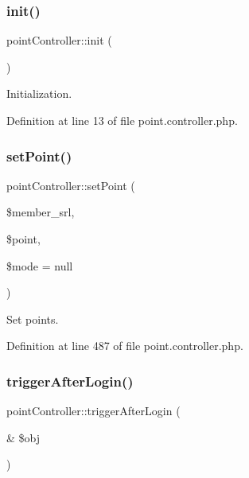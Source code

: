 \subsubsection{\texorpdfstring{init()}{init()}}
{\footnotesize\ttfamily point\+Controller\+::init (\begin{DoxyParamCaption}{ }\end{DoxyParamCaption})}



Initialization. 



Definition at line 13 of file point.\+controller.\+php.

\hypertarget{classpointController_a1d45833bcf85677a723269af3e13c675}{}\label{classpointController_a1d45833bcf85677a723269af3e13c675} 
\subsubsection{\texorpdfstring{set\+Point()}{setPoint()}}
{\footnotesize\ttfamily point\+Controller\+::set\+Point (\begin{DoxyParamCaption}\item[{}]{\$member\+\_\+srl,  }\item[{}]{\$point,  }\item[{}]{\$mode = {\ttfamily null} }\end{DoxyParamCaption})}



Set points. 



Definition at line 487 of file point.\+controller.\+php.

\hypertarget{classpointController_aa0a463b222d4980e729e27e104e11f43}{}\label{classpointController_aa0a463b222d4980e729e27e104e11f43} 
\subsubsection{\texorpdfstring{trigger\+After\+Login()}{triggerAfterLogin()}}
{\footnotesize\ttfamily point\+Controller\+::trigger\+After\+Login (\begin{DoxyParamCaption}\item[{\&}]{\$obj }\end{DoxyParamCaption})}



